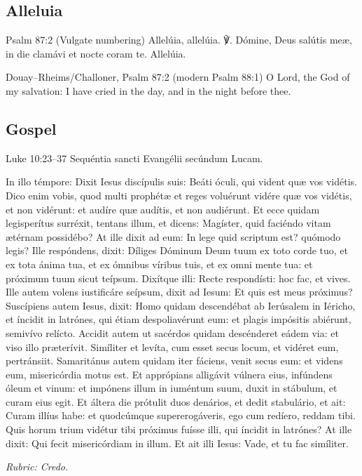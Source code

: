 \elementguard
\subsection*{Alleluia }
\begin{appointedlatin}{Psalm 87:2 (Vulgate numbering)}
Allelúia, allelúia. ℣. Dómine, Deus salútis meæ, in die clamávi et nocte
coram te. Allelúia.
\end{appointedlatin}
\begin{namedtranslation}{Douay--Rheims/Challoner, Psalm 87:2 (modern Psalm 88:1)}
O Lord, the God of my salvation: I have cried in the day, and in the night
before thee.
\end{namedtranslation}

\elementguard
\subsection*{Gospel }
\begin{appointedlatin}{Luke 10:23--37}
Sequéntia sancti Evangélii secúndum Lucam.

In illo témpore: Dixit Iesus discípulis suis: Beáti óculi, qui vident quæ vos
vidétis. Dico enim vobis, quod multi prophétæ et reges voluérunt vidére quæ
vos vidétis, et non vidérunt: et audíre quæ audítis, et non audiérunt. Et ecce
quidam legisperítus surréxit, tentans illum, et dicens: Magíster, quid
faciéndo vitam ætérnam possidébo? At ille dixit ad eum: In lege quid scriptum
est? quómodo legis? Ille respóndens, dixit: Díliges Dóminum Deum tuum ex toto
corde tuo, et ex tota ánima tua, et ex ómnibus víribus tuis, et ex omni mente
tua: et próximum tuum sicut teípsum. Dixítque illi: Recte respondísti: hoc
fac, et vives. Ille autem volens iustificáre seípsum, dixit ad Iesum: Et quis
est meus próximus? Suscípiens autem Iesus, dixit: Homo quidam descendébat ab
Ierúsalem in Iéricho, et íncidit in latrónes, qui étiam despoliavérunt eum:
et plagis impósitis abiérunt, semivívo relícto. Accidit autem ut sacérdos
quidam descénderet eádem via: et viso illo præterívit. Simíliter et levíta,
cum esset secus locum, et vidéret eum, pertránsiit. Samaritánus autem quidam
iter fáciens, venit secus eum: et videns eum, misericórdia motus est. Et
apprópians alligávit vúlnera eius, infúndens óleum et vinum: et impónens illum
in iuméntum suum, duxit in stábulum, et curam eius egit. Et áltera die
prótulit duos denários, et dedit stabulário, et ait: Curam illíus habe: et
quodcúmque supererogáveris, ego cum redíero, reddam tibi. Quis horum trium
vidétur tibi próximus fuísse illi, qui íncidit in latrónes? At ille dixit:
Qui fecit misericórdiam in illum. Et ait illi Iesus: Vade, et tu fac
simíliter.

\emph{Rubric: Credo.}
\end{appointedlatin}
